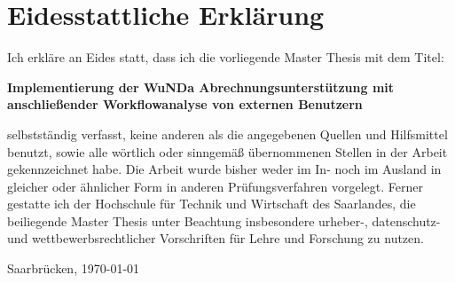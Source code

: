 \chapter*{Eidesstattliche Erklärung}

Ich erkläre an Eides statt, dass ich die vorliegende Master Thesis mit dem Titel:

\hspace{1.0cm}

{  \bfseries Implementierung der WuNDa
Abrechnungsunterstützung mit anschließender
Workflowanalyse von externen Benutzern }

\hspace{1.0cm}

selbstständig verfasst, keine anderen als die angegebenen Quellen und Hilfsmittel
benutzt, sowie alle wörtlich oder sinngemäß übernommenen Stellen in der Arbeit
gekennzeichnet habe. Die Arbeit wurde bisher weder im In- noch im Ausland in
gleicher oder ähnlicher Form in anderen Prüfungsverfahren vorgelegt. Ferner gestatte
ich der Hochschule für Technik und Wirtschaft des Saarlandes, die beiliegende
Master Thesis unter Beachtung insbesondere urheber-, datenschutz- und
wettbewerbsrechtlicher Vorschriften für Lehre und Forschung zu nutzen.


\vfill

{\large Saarbrücken, { \today}}


